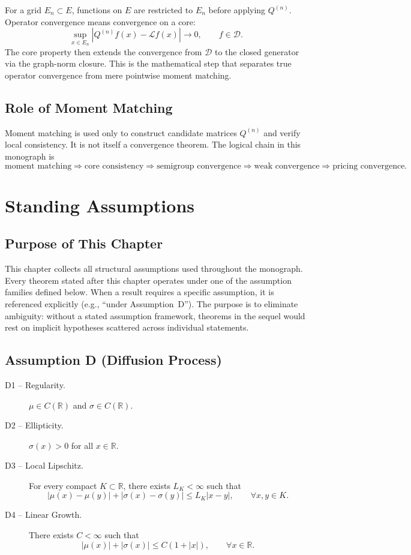 \documentclass[11pt,a4paper,openany]{book}
\theoremstyle{definition}
\theoremstyle{plain}
\theoremstyle{remark}
\newcommand{\1}{\mathbbm{1}}
\newcommand{\R}{\mathbb{R}}
\begin{document}
For a grid $E_n\subset E$, functions on $E$ are restricted to $E_n$ before applying $Q^{(n)}$. Operator convergence means convergence on a core:
\[
\sup_{x\in E_n}|Q^{(n)}f(x)-\mathcal{L}f(x)|\to0, \qquad f\in\mathcal{D}.
\]
The core property then extends the convergence from $\mathcal{D}$ to the closed generator via the graph-norm closure. This is the mathematical step that separates true operator convergence from mere pointwise moment matching.

\section{Role of Moment Matching}

Moment matching is used only to construct candidate matrices $Q^{(n)}$ and verify local consistency. It is not itself a convergence theorem. The logical chain in this monograph is
\[
\text{moment matching} \Rightarrow \text{core consistency} \Rightarrow \text{semigroup convergence} \Rightarrow \text{weak convergence} \Rightarrow \text{pricing convergence}.
\]

\newpage

\chapter*{Standing Assumptions}

\section{Purpose of This Chapter}
This chapter collects all structural assumptions used throughout the monograph. Every theorem stated after this chapter operates under one of the assumption families defined below. When a result requires a specific assumption, it is referenced explicitly (e.g., ``under Assumption~D''). The purpose is to eliminate ambiguity: without a stated assumption framework, theorems in the sequel would rest on implicit hypotheses scattered across individual statements.

\section{Assumption D (Diffusion Process)}

\begin{description}
    \item[D1 -- Regularity.] $\mu \in C(\R)$ and $\sigma \in C(\R)$.
    \item[D2 -- Ellipticity.] $\sigma(x) > 0$ for all $x \in \R$.
    \item[D3 -- Local Lipschitz.] For every compact $K \subset \R$, there exists $L_{K} < \infty$ such that
    \[
    |\mu(x) - \mu(y)| + |\sigma(x) - \sigma(y)| \leq L_{K} |x-y|, \qquad \forall x,y \in K.
    \]
    \item[D4 -- Linear Growth.] There exists $C < \infty$ such that
    \[
    |\mu(x)| + |\sigma(x)| \leq C(1 + |x|), \qquad \forall x \in \R.
    \]
\end{description}
\end{document}
